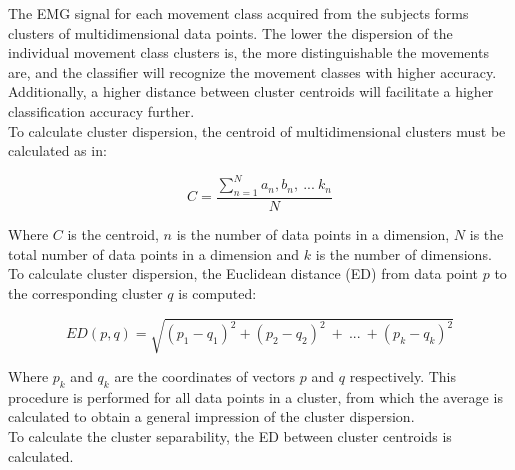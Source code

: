 The EMG signal for each movement class acquired from the subjects forms clusters of multidimensional data points. The lower the dispersion of the individual movement class clusters is, the more distinguishable the movements are, and the classifier will recognize the movement classes with higher accuracy. Additionally, a higher distance between cluster centroids will facilitate a higher classification accuracy further. \\%
To calculate cluster dispersion, the centroid of multidimensional clusters must be calculated as in:
\vspace{-0.5cm}

 \begin{equation} \label{eq:centroid}
C = \frac{\sum\limits_{n=1}^{N}a_{n},b_{n},~...~k_{n}}{N}
\end{equation}
\vspace{-0.5cm}

Where $C$ is the centroid, $n$ is the number of data points in a dimension, $N$ is the total number of data points in a dimension and $k$ is the number of dimensions. To calculate cluster dispersion, the Euclidean distance (ED) from data point $p$ to the corresponding cluster $q$ is computed: %
\vspace{-0.5cm}

\begin{equation} \label{eq:euclidiandistance}
ED(p,q) = \sqrt{(p_1-q_1)^2 + (p_2-q_2)^2~+~...~+ (p_k-q_k)^2}
\end{equation} 
\vspace{-0.5cm}

Where $p_k$ and $q_k$ are the coordinates of vectors $p$ and $q$ respectively. This procedure is performed for all data points in a cluster, from which the average is calculated to obtain a general impression of the cluster dispersion.\\
To calculate the cluster separability, the ED between cluster centroids is calculated.  

